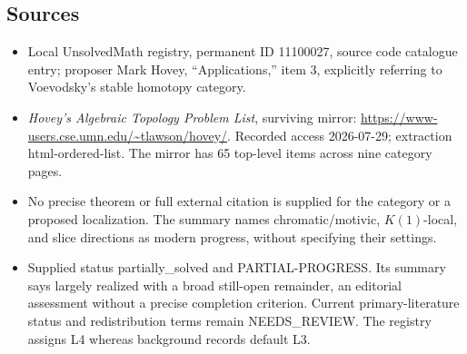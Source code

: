\documentclass[11pt]{article}
\begin{document}
\subsection{Sources}
\begin{itemize}
\item Local UnsolvedMath registry, permanent ID 11100027, source code catalogue entry; proposer Mark Hovey, ``Applications,'' item 3, explicitly referring to Voevodsky's stable homotopy category.
\item \emph{Hovey's Algebraic Topology Problem List}, surviving mirror: \url{https://www-users.cse.umn.edu/~tlawson/hovey/}. Recorded access 2026-07-29; extraction html-ordered-list. The mirror has 65 top-level items across nine category pages.
\item No precise theorem or full external citation is supplied for the category or a proposed localization. The summary names chromatic/motivic, \(K(1)\)-local, and slice directions as modern progress, without specifying their settings.
\item Supplied status partially\_solved and PARTIAL-PROGRESS. Its summary says largely realized with a broad still-open remainder, an editorial assessment without a precise completion criterion. Current primary-literature status and redistribution terms remain NEEDS\_REVIEW. The registry assigns L4 whereas background records default L3.
\end{itemize}
\end{document}
